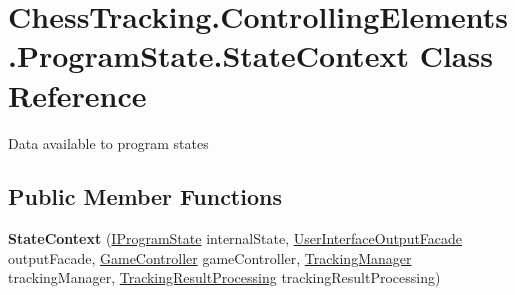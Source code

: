 \hypertarget{class_chess_tracking_1_1_controlling_elements_1_1_program_state_1_1_state_context}{}\section{Chess\+Tracking.\+Controlling\+Elements.\+Program\+State.\+State\+Context Class Reference}
\label{class_chess_tracking_1_1_controlling_elements_1_1_program_state_1_1_state_context}


Data available to program states  


\subsection*{Public Member Functions}
\begin{DoxyCompactItemize}
\item 
\mbox{\label{class_chess_tracking_1_1_controlling_elements_1_1_program_state_1_1_state_context_a73199046eb44a47cb6853d2fc239558b}} 
{\bfseries State\+Context} (\mbox{\hyperlink{interface_chess_tracking_1_1_controlling_elements_1_1_program_state_1_1_i_program_state}{I\+Program\+State}} internal\+State, \mbox{\hyperlink{class_chess_tracking_1_1_user_interface_1_1_user_interface_output_facade}{User\+Interface\+Output\+Facade}} output\+Facade, \mbox{\hyperlink{class_chess_tracking_1_1_game_1_1_game_controller}{Game\+Controller}} game\+Controller, \mbox{\hyperlink{class_chess_tracking_1_1_controlling_elements_1_1_tracking_manager}{Tracking\+Manager}} tracking\+Manager, \mbox{\hyperlink{class_chess_tracking_1_1_controlling_elements_1_1_tracking_result_processing}{Tracking\+Result\+Processing}} tracking\+Result\+Processing)
\end{DoxyCompactItemize}
